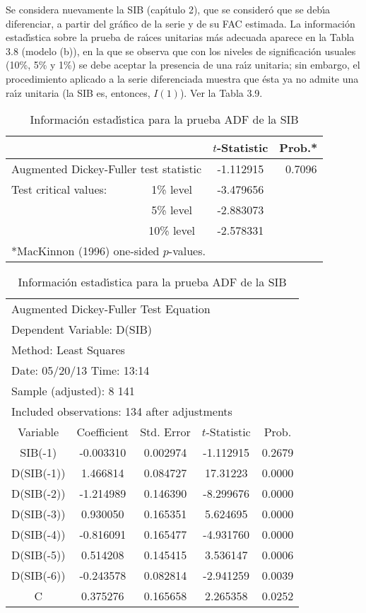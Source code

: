 \begin{ejemplo}
Se considera nuevamente la SIB (cap\'{\i}tulo 2), que 
se consider\'{o} que se deb\'{\i}a diferenciar, a partir del gr\'{a}fico de 
la serie y de su FAC estimada. La informaci\'{o}n estad\'{\i}stica sobre la 
prueba de ra\'{\i}ces unitarias m\'{a}s adecuada aparece en la Tabla 3.8 
(modelo (b)), en la que se observa que con los niveles de significaci\'{o}n 
usuales (10{\%}, 5{\%} y 1{\%}) se debe aceptar la presencia de una 
ra\'{\i}z unitaria; sin embargo, el procedimiento aplicado a la serie 
diferenciada muestra que \'{e}sta ya no admite una ra\'{\i}z unitaria (la 
SIB es, entonces, $I(1)$). Ver la Tabla 3.9.

\begin{table}[H]
\centering\small
\caption{Informaci\'{o}n estad\'{\i}stica para la prueba ADF de la SIB}
\begin{tabular}{lccc}
\toprule
& & $t$-Statistic& Prob.* \\
\midrule
\multicolumn{2}{l}{Augmented Dickey-Fuller test statistic} & -1.112915& ~0.7096 \\
\midrule
Test critical values:& 1{\%} level&  -3.479656&  \\
& 5{\%} level& -2.883073&  \\
& 10{\%} level& -2.578331&  \\
\bottomrule
\multicolumn{4}{l}{*MacKinnon (1996) one-sided $p$-values.}
\end{tabular}

\vspace{8mm}
\begin{tabular}{ccccc}
\multicolumn{4}{l}{Augmented Dickey-Fuller Test Equation}  \\
\multicolumn{4}{l}{Dependent Variable: D(SIB)} \\
\multicolumn{4}{l}{Method: Least Squares} \\
\multicolumn{4}{l}{Date: 05/20/13 Time: 13:14} \\
\multicolumn{4}{l}{Sample (adjusted): 8 141}  \\
\multicolumn{4}{l}{Included observations: 134 after adjustments}  \\
\toprule
Variable& Coefficient& Std. Error& $t$-Statistic& Prob. \\
\midrule
SIB(-1)& -0.003310& 0.002974& -1.112915& 0.2679 \\
D(SIB(-1))& 1.466814& 0.084727& 17.31223& 0.0000 \\
D(SIB(-2))& -1.214989& 0.146390& -8.299676& 0.0000 \\
D(SIB(-3))& 0.930050& 0.165351& 5.624695& 0.0000 \\
D(SIB(-4))& -0.816091& 0.165477& -4.931760& 0.0000 \\
D(SIB(-5))& 0.514208& 0.145415& 3.536147& 0.0006 \\
D(SIB(-6))& -0.243578& 0.082814& -2.941259& 0.0039 \\
C& 0.375276& 0.165658& 2.265358& 0.0252 \\
\bottomrule
\end{tabular}
\end{table}



\end{ejemplo}
